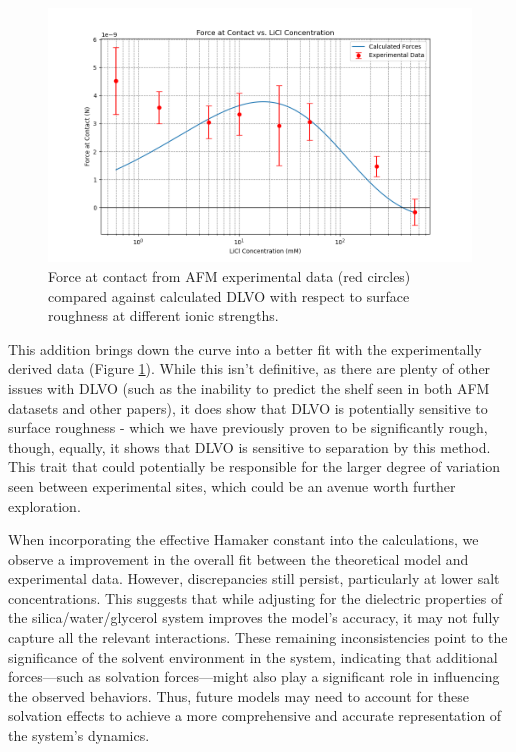 \begin{figure}[h!]
\centering
\includegraphics[width=\textwidth]{chapter8/Calculated/roughness.png}
\caption{Force at contact from AFM experimental data (red circles) compared against calculated DLVO with respect to surface roughness at different ionic strengths.}
\label{fig:calc2}
\end{figure}

This addition brings down the curve into a better fit with the experimentally derived data (Figure \ref{fig:calc2}). While this isn't definitive, as there are plenty of other issues with DLVO (such as the inability to predict the shelf seen in both AFM datasets and other papers), it does show that DLVO is potentially sensitive to surface roughness - which we have previously proven to be significantly rough, though, equally, it shows that DLVO is sensitive to separation by this method. This trait that could potentially be responsible for the larger degree of variation seen between experimental sites, which could be an avenue worth further exploration.


When incorporating the effective Hamaker constant into the calculations, we observe a  improvement in the overall fit between the theoretical model and experimental data. However, discrepancies still persist, particularly at lower salt concentrations. This suggests that while adjusting for the dielectric properties of the silica/water/glycerol system improves the model's accuracy, it may not fully capture all the relevant interactions. These remaining inconsistencies point to the significance of the solvent environment in the system, indicating that additional forces—such as solvation forces—might also play a significant role in influencing the observed behaviors. Thus, future models may need to account for these solvation effects to achieve a more comprehensive and accurate representation of the system's dynamics.

